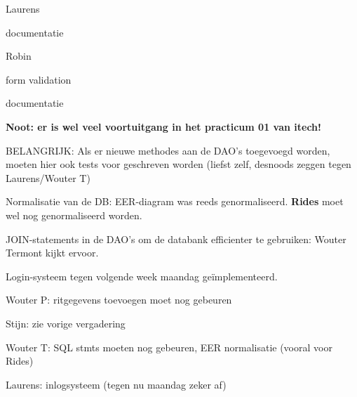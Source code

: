 \documentclass[11pt,a4paper,oneside]{article}
\renewenvironment{itemize}[1]{\begin{compactitem}#1}{\end{compactitem}}
\begin{document}
\begin{itemize}
\begin{itemize}
\begin{itemize}
              \end{itemize}
            \item Laurens
              \begin{itemize}
                  \item documentatie
              \end{itemize}
            \item Robin
              \begin{itemize}
                  \item form validation
                  \item documentatie
              \end{itemize}
        \end{itemize}
        \textbf{Noot: er is wel veel voortuitgang in het practicum 01 van itech!}    
		
		\item BELANGRIJK: Als er nieuwe methodes aan de DAO's toegevoegd worden, moeten hier ook tests voor geschreven worden (liefst zelf, desnoods zeggen tegen Laurens/Wouter T)
		
		\item Normalisatie van de DB: EER-diagram was reeds genormaliseerd. \textbf{Rides} moet wel nog genormaliseerd worden.	
        
        \item JOIN-statements in de DAO's om de databank efficienter te gebruiken: Wouter Termont kijkt ervoor. 
        
        \item Login-systeem tegen volgende week maandag ge\"{i}mplementeerd.
        
        \item 	\begin{itemize}
        
        				\item Wouter P: ritgegevens toevoegen moet nog gebeuren
                    
                    \item Stijn: zie vorige vergadering
                    
                    \item Wouter T: SQL stmts moeten nog gebeuren, EER normalisatie (vooral voor Rides)
                    
                    \item Laurens: inlogsysteem (tegen nu maandag zeker af)
                    

\end{itemize}
\end{itemize}
\end{document}
